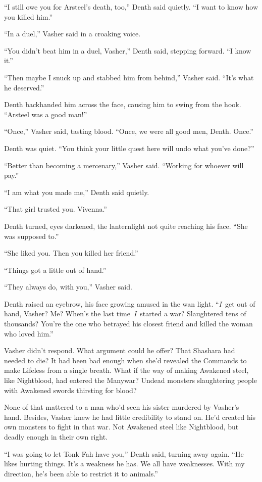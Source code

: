 “I still owe you for Arsteel’s death, too,” Denth said quietly. “I want to know how you killed him.”

“In a duel,” Vasher said in a croaking voice.

“You didn’t beat him in a duel, Vasher,” Denth said, stepping forward. “I know it.”

“Then maybe I snuck up and stabbed him from behind,” Vasher said. “It’s what he deserved.”

Denth backhanded him across the face, causing him to swing from the hook. “Arsteel was a good man!”

“Once,” Vasher said, tasting blood. “Once, we were all good men, Denth. Once.”

Denth was quiet. “You think your little quest here will undo what you’ve done?”

“Better than becoming a mercenary,” Vasher said. “Working for whoever will pay.”

“I am what you made me,” Denth said quietly.

“That girl trusted you. Vivenna.”

Denth turned, eyes darkened, the lanternlight not quite reaching his face. “She was supposed to.”

“She liked you. Then you killed her friend.”

“Things got a little out of hand.”

“They always do, with you,” Vasher said.

Denth raised an eyebrow, his face growing amused in the wan light. “\textit{I}~get out of hand, Vasher? Me? When’s the last time~\textit{I}~started a war? Slaughtered tens of thousands? You’re the one who betrayed his closest friend and killed the woman who loved him.”

Vasher didn’t respond. What argument could he offer? That Shashara had needed to die? It had been bad enough when she’d revealed the Commands to make Lifeless from a single breath. What if the way of making Awakened steel, like Nightblood, had entered the Manywar? Undead monsters slaughtering people with Awakened swords thirsting for blood?

None of that mattered to a man who’d seen his sister murdered by Vasher’s hand. Besides, Vasher knew he had little credibility to stand on. He’d created his own monsters to fight in that war. Not Awakened steel like Nightblood, but deadly enough in their own right.

“I was going to let Tonk Fah have you,” Denth said, turning away again. “He likes hurting things. It’s a weakness he has. We all have weaknesses. With my direction, he’s been able to restrict it to animals.”


